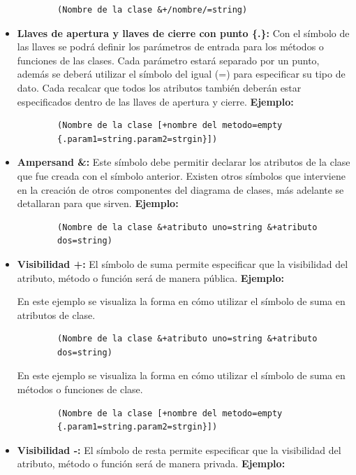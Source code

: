 \begin{itemize}
	\begin{verbatim}
		(Nombre de la clase &+/nombre/=string)
	\end{verbatim} 
	
	\item \textbf{Llaves de apertura y llaves de cierre con punto \{.\}:} Con el símbolo de las llaves se podrá definir los parámetros de entrada para los métodos o funciones de las clases. Cada parámetro estará separado por un punto, además se deberá utilizar el símbolo del igual (=) para especificar su tipo de dato. Cada recalcar que todos los atributos también deberán estar especificados dentro de las llaves de apertura y cierre. \textbf{Ejemplo:}
	
	\begin{verbatim}
		(Nombre de la clase [+nombre del metodo=empty
		{.param1=string.param2=strgin}])
	\end{verbatim}
	
	\item \textbf{Ampersand \&: } Este símbolo debe permitir declarar los atributos de la clase que fue creada con el símbolo anterior. Existen otros símbolos que interviene en la creación de otros componentes del diagrama de clases, más adelante se detallaran para que sirven. \textbf{Ejemplo:}
	
	\begin{verbatim}
		(Nombre de la clase &+atributo uno=string &+atributo 
		dos=string)
	\end{verbatim}
	
	\item \textbf{Visibilidad +: } El símbolo de suma permite especificar que la visibilidad del atributo, método o función será de manera pública. \textbf{Ejemplo:}
	
	En este ejemplo se visualiza la forma en cómo utilizar el símbolo de suma en atributos de clase.
	
	\begin{verbatim}
		(Nombre de la clase &+atributo uno=string &+atributo 
		dos=string)
	\end{verbatim}
	
	En este ejemplo se visualiza la forma en cómo utilizar el símbolo de suma en métodos o funciones de clase.
	
	\begin{verbatim}
		(Nombre de la clase [+nombre del metodo=empty
		{.param1=string.param2=strgin}])
	\end{verbatim}
	
	\item \textbf{Visibilidad -: } El símbolo de resta permite especificar que la visibilidad del atributo, método o función será de manera privada. \textbf{Ejemplo:}
	

\end{itemize}

